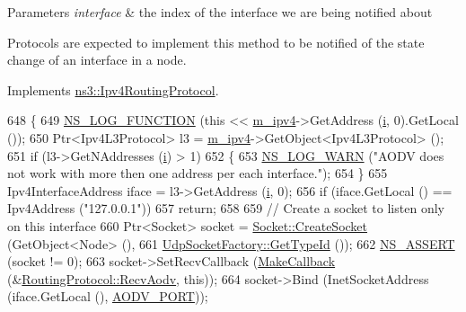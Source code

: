 \begin{DoxyParams}{Parameters}
{\em interface} & the index of the interface we are being notified about\\
\hline
\end{DoxyParams}
Protocols are expected to implement this method to be notified of the state change of an interface in a node. 

Implements \hyperlink{classns3_1_1Ipv4RoutingProtocol_aabb99ce7a048e75ff4b36fa9af8745e4}{ns3\+::\+Ipv4\+Routing\+Protocol}.


\begin{DoxyCode}
648 \{
649   \hyperlink{log-macros-disabled_8h_a90b90d5bad1f39cb1b64923ea94c0761}{NS\_LOG\_FUNCTION} (\textcolor{keyword}{this} << \hyperlink{classns3_1_1aodv_1_1RoutingProtocol_aee33006b1f9d8b24d4722037ff3fec98}{m\_ipv4}->GetAddress (\hyperlink{bernuolliDistribution_8m_a6f6ccfcf58b31cb6412107d9d5281426}{i}, 0).GetLocal ());
650   Ptr<Ipv4L3Protocol> l3 = \hyperlink{classns3_1_1aodv_1_1RoutingProtocol_aee33006b1f9d8b24d4722037ff3fec98}{m\_ipv4}->GetObject<Ipv4L3Protocol> ();
651   \textcolor{keywordflow}{if} (l3->GetNAddresses (\hyperlink{bernuolliDistribution_8m_a6f6ccfcf58b31cb6412107d9d5281426}{i}) > 1)
652     \{
653       \hyperlink{group__logging_gade7208b4009cdf0e25783cd26766f559}{NS\_LOG\_WARN} (\textcolor{stringliteral}{"AODV does not work with more then one address per each interface."});
654     \}
655   Ipv4InterfaceAddress iface = l3->GetAddress (\hyperlink{bernuolliDistribution_8m_a6f6ccfcf58b31cb6412107d9d5281426}{i}, 0);
656   \textcolor{keywordflow}{if} (iface.GetLocal () == Ipv4Address (\textcolor{stringliteral}{"127.0.0.1"}))
657     \textcolor{keywordflow}{return};
658  
659   \textcolor{comment}{// Create a socket to listen only on this interface}
660   Ptr<Socket> socket = \hyperlink{classns3_1_1Socket_ad448a62bb50ad3dbac59c879a885a8d2}{Socket::CreateSocket} (GetObject<Node> (),
661                                              \hyperlink{classns3_1_1UdpSocketFactory_ad5b47e944de8861e3dc2b6de1ccbdf5b}{UdpSocketFactory::GetTypeId} ());
662   \hyperlink{assert_8h_a6dccdb0de9b252f60088ce281c49d052}{NS\_ASSERT} (socket != 0);
663   socket->SetRecvCallback (\hyperlink{group__makecallbackmemptr_ga9376283685aa99d204048d6a4b7610a4}{MakeCallback} (&\hyperlink{classns3_1_1aodv_1_1RoutingProtocol_a08c44000f66533e69bde85d68d75c354}{RoutingProtocol::RecvAodv}, \textcolor{keyword}{
      this}));
664   socket->Bind (InetSocketAddress (iface.GetLocal (), \hyperlink{classns3_1_1aodv_1_1RoutingProtocol_ac4a3de99b49ad5f6efc9b71a700f7ec4}{AODV\_PORT}));

\end{DoxyCode}
